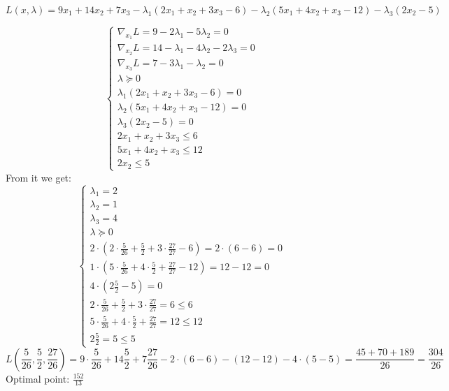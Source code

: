 \begin{equation*}
    L(x, \lambda) = 9x_1 + 14x_2 + 7x_3 - \lambda_1(2x_1 + x_2 + 3x_3 - 6) - \lambda_2(5x_1 + 4x_2 + x_3 - 12) - \lambda_3 (2x_2 -5)
\end{equation*}

\begin{equation*}
    \begin{cases}
    \nabla_{x_1} L = 9  - 2\lambda_1 - 5\lambda_2 = 0 \\
    \nabla_{x_2} L = 14 - \lambda_1  - 4\lambda_2 - 2\lambda_3 = 0 \\
    \nabla_{x_3} L = 7  - 3\lambda_1 - \lambda_2 = 0 \\
    \lambda \succcurlyeq 0 \\
    \lambda_1 (2x_1 + x_2 + 3x_3 - 6) = 0 \\
    \lambda_2 (5x_1 + 4x_2 + x_3 - 12) = 0 \\
    \lambda_3 (2x_2 - 5) = 0 \\
    2x_1 + x_2 + 3x_3 \leq 6 \\
    5x_1 + 4x_2 + x_3 \leq 12 \\
    2x_2 \leq 5
    \end{cases}
\end{equation*}
From it we get:
\begin{equation*}
\begin{cases}
    \lambda_1 = 2 \\
    \lambda_2 = 1 \\
    \lambda_3 = 4 \\
    \lambda \succcurlyeq 0 \\
    2\cdot(2 \cdot \frac{5}{26} + \frac{5}{2} + 3 \cdot \frac{27}{27} - 6) = 2\cdot(6 -6) = 0 \\
    1 \cdot(5 \cdot \frac{5}{26} + 4 \cdot \frac{5}{2} + \frac{27}{27} - 12) = 12 - 12 = 0 \\
    4 \cdot (2 \frac{5}{2} - 5) = 0 \\
    2 \cdot \frac{5}{26} + \frac{5}{2} + 3 \cdot \frac{27}{27} = 6 \leq 6 \\  
    5 \cdot \frac{5}{26} + 4 \cdot \frac{5}{2} + \frac{27}{27} = 12 \leq 12 \\
    2 \frac{5}{2} = 5 \leq 5
\end{cases}
\end{equation*}
\begin{equation*}
    L(\frac{5}{26}, \frac{5}{2}, \frac{27}{26}) = 9 \cdot \frac{5}{26} + 14 \frac{5}{2} + 7 \frac{27}{26} - 2 \cdot(6-6) - (12 - 12) - 4 \cdot (5 - 5) = \frac{45 + 70 + 189}{26} = \frac{304}{26}
\end{equation*}
Optimal point: $\frac{152}{13}$

